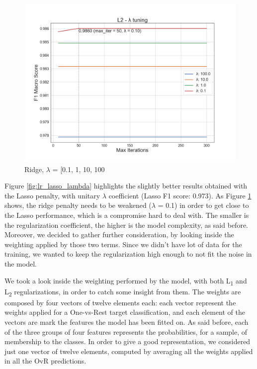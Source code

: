 \begin{figure}
	\includegraphics[width=\columnwidth]{chapter5/figure/logreg_l2_lambda.png}\par 
	\caption{Ridge, $ \lambda$ = [0.1, 1, 10, 100}
	\label{fig:lr_ridge_lambda}
\end{figure}

Figure \ref{fig:lr_lasso_lambda} highlights the slightly better results obtained with the Lasso penalty, with unitary $ \lambda $ coefficient (Lasso F1 score: 0.973).
As Figure \ref{fig:lr_ridge_lambda} shows, the ridge penalty needs to be weakened ($ \lambda $ = 0.1) in order to get close to the Lasso performance, which is a compromise hard to deal with. The smaller  is the regularization coefficient, the higher is the model complexity, as said before.
Moreover, we decided to gather further consideration, by looking inside the weighting applied by those two terms.
Since we didn't have lot of data for the training, we wanted to keep the regularization high enough to not fit the noise in the model.

We took a look inside the weighting performed by the model, with both L\textsubscript{1} and L\textsubscript{2} regularizations, in order to catch some insight from them.
The weights are composed by four vectors of twelve elements each: each vector represent the weights applied for a One-vs-Rest target classification, and each element of the vectors are mark the features the model has been fitted on. As said before, each of the three groups of four features represents the probabilities, for a sample, of membership to the classes.
In order to give a good representation, we considered just one vector of twelve elements, computed by averaging all the weights applied in all the OvR predictions.

